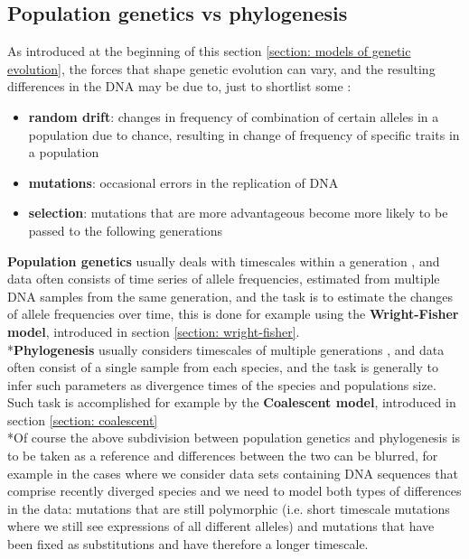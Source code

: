 \documentclass[12pt,mythesisstyle]{report}
\begin{document}
\subsection{Population genetics vs phylogenesis}\label{section: genetics vs phylogenesis}
As introduced at the beginning of this section \ref{section: models of genetic evolution}, the forces that shape genetic evolution can vary, and the resulting differences in the DNA may be due to, just to shortlist some  \cite{wrightexplained}:
\begin{itemize}
	\item \textbf{random drift}: changes in frequency of combination of certain alleles in a population due to chance, resulting in change of frequency of specific traits in a population
	\item \textbf{mutations}: occasional errors in the replication of DNA
	\item \textbf{selection}: mutations that are more advantageous become more likely to be passed to the following generations
\end{itemize}
\textbf{Population genetics} usually deals with timescales within a generation \cite{wrightexplained}, and data often consists of time series of allele frequencies, estimated from multiple DNA samples from the same generation, and the task is to estimate the changes of allele frequencies over time, this is done for example using the \textbf{Wright-Fisher model}, introduced in section \ref{section: wright-fisher}.
\\*\textbf{Phylogenesis} usually considers timescales of multiple generations \cite{wrightexplained}, and data often consist of a single sample from each species, and the task is generally to infer such parameters as divergence times of the species and populations size. Such task is accomplished for example by the \textbf{Coalescent model}, introduced in section \ref{section: coalescent}
\\*Of course the above subdivision between population genetics and phylogenesis is to be taken as a reference and differences between the two can be blurred, for example in the cases where we consider data sets containing DNA sequences that comprise recently diverged species and we need to model both types of differences in the data: mutations that are still polymorphic (i.e. short timescale mutations where we still see expressions of all different alleles) and mutations that have been fixed as substitutions and have therefore a longer timescale\cite{wrightexplained}.
\end{document}
